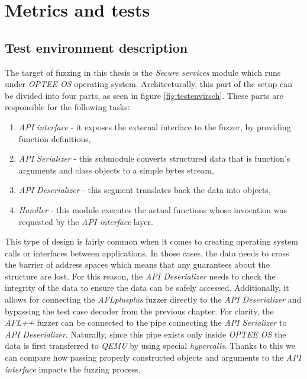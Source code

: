 \cleardoublepage
\section{Metrics and tests} \label{chap:tests}

\subsection{Test environment description}

The target of fuzzing in this thesis is the \textit{Secure services} module which runs under \textit{OPTEE OS} operating system. Architecturally, this part of the setup can be divided into four parts, as seen in figure \ref{fig:testenvirsch}. These parts are responsible for the following tasks:
\begin{enumerate}
    \item \textit{API interface} - it exposes the external interface to the fuzzer, by providing function definitions,
    \item \textit{API Serializer} - this submodule converts structured data that is function's arguments and class objects to a simple bytes stream,
    \item \textit{API Deserializer} - this segment translates back the data into objects,
    \item \textit{Handler} - this module executes the actual functions whose invocation was requested by the \textit{API interface} layer.
\end{enumerate}
This type of design is fairly common when it comes to creating operating system calls or interfaces between applications. In those cases, the data needs to cross the barrier of address spaces which means that any guarantees about the structure are lost. For this reason, the \textit{API Deserializer} needs to check the integrity of the data to ensure the data can be safely accessed. Additionally, it allows for connecting the \textit{AFLplusplus} fuzzer directly to the \textit{API Deserializer} and bypassing the test case decoder from the previous chapter. For clarity, the \textit{AFL++} fuzzer can be connected to the pipe connecting the \textit{API Serializer} to \textit{API Deserializer}. Naturally, since this pipe exists only inside \textit{OPTEE OS} the data is first transferred to \textit{QEMU} by using special \textit{hypercalls}. Thanks to this we can compare how passing properly constructed objects and arguments to the \textit{API interface} impacts the fuzzing process.

